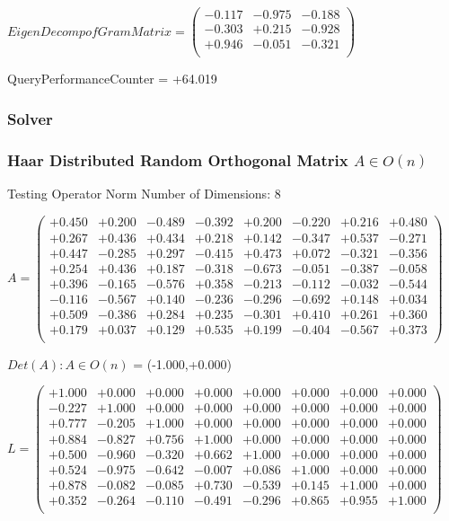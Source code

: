 \documentclass[9pt]{article}
\theoremstyle{plain}
\theoremstyle{definition}
\theoremstyle{remark}
\numberwithin{equation}{section}
\begin{document}
$EigenDecomp of Gram Matrix = \left(
\begin{array}{
ccc}
-0.117 & -0.975 & -0.188 \\
-0.303 & +0.215 & -0.928 \\
+0.946 & -0.051 & -0.321 \\
\end{array}
\right)$ \newline 

QueryPerformanceCounter  =  +64.019
\subsubsection{Solver }
\subsubsection{Haar Distributed Random Orthogonal Matrix $A \in O(n)$}
 Testing Operator Norm
Number of Dimensions: 8

$A = \left(
\begin{array}{
cccccccc}
+0.450 & +0.200 & -0.489 & -0.392 & +0.200 & -0.220 & +0.216 & +0.480 \\
+0.267 & +0.436 & +0.434 & +0.218 & +0.142 & -0.347 & +0.537 & -0.271 \\
+0.447 & -0.285 & +0.297 & -0.415 & +0.473 & +0.072 & -0.321 & -0.356 \\
+0.254 & +0.436 & +0.187 & -0.318 & -0.673 & -0.051 & -0.387 & -0.058 \\
+0.396 & -0.165 & -0.576 & +0.358 & -0.213 & -0.112 & -0.032 & -0.544 \\
-0.116 & -0.567 & +0.140 & -0.236 & -0.296 & -0.692 & +0.148 & +0.034 \\
+0.509 & -0.386 & +0.284 & +0.235 & -0.301 & +0.410 & +0.261 & +0.360 \\
+0.179 & +0.037 & +0.129 & +0.535 & +0.199 & -0.404 & -0.567 & +0.373 \\
\end{array}
\right)$ \newline 

$Det(A) :   A \in O(n)$ = (-1.000,+0.000)

$L = \left(
\begin{array}{
cccccccc}
+1.000 & +0.000 & +0.000 & +0.000 & +0.000 & +0.000 & +0.000 & +0.000 \\
-0.227 & +1.000 & +0.000 & +0.000 & +0.000 & +0.000 & +0.000 & +0.000 \\
+0.777 & -0.205 & +1.000 & +0.000 & +0.000 & +0.000 & +0.000 & +0.000 \\
+0.884 & -0.827 & +0.756 & +1.000 & +0.000 & +0.000 & +0.000 & +0.000 \\
+0.500 & -0.960 & -0.320 & +0.662 & +1.000 & +0.000 & +0.000 & +0.000 \\
+0.524 & -0.975 & -0.642 & -0.007 & +0.086 & +1.000 & +0.000 & +0.000 \\
+0.878 & -0.082 & -0.085 & +0.730 & -0.539 & +0.145 & +1.000 & +0.000 \\
+0.352 & -0.264 & -0.110 & -0.491 & -0.296 & +0.865 & +0.955 & +1.000 \\
\end{array}
\right)$ \newline 
\end{document}
